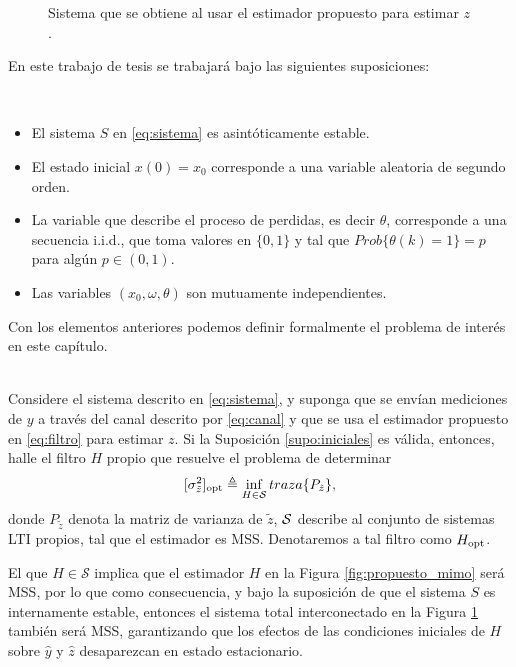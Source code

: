 \begin{figure}[htbp]
\centering
\scalebox{1.2}{}
\caption{Sistema que se obtiene al usar el estimador propuesto para estimar $z$.}
\label{fig:switcheado_mimo}
\end{figure}

En este trabajo de tesis se trabajar\'a bajo las siguientes suposiciones:
\begin{assu}\label{supo:iniciales}{\ \\}
\begin{itemize}
\item El sistema $S$ en \eqref{eq:sistema} es asint\'oticamente estable.
\item El estado inicial $x(0)=x_0$ corresponde a una variable aleatoria de segundo orden.
\item La variable que describe el proceso de perdidas, es decir $\theta$, corresponde a una secuencia i.i.d., que toma valores en $\{0,1\}$ y tal que $Prob\{\theta(k)=1\}=p$ para alg\'un $p\in \left( 0,1\right).$
\item Las variables $\left(x_0,\omega,\theta\right)$ son mutuamente independientes.
\end{itemize}
\end{assu}
Con los elementos anteriores podemos definir formalmente el problema de inter\'es en este cap\'itulo.
\begin{problema}\label{problema:def}{\ \\}
Considere el sistema descrito en \eqref{eq:sistema}, y suponga que se env\'ian mediciones de $y$ a trav\'es del canal descrito por \eqref{eq:canal} y que se usa el estimador propuesto en \eqref{eq:filtro} para estimar $z$. Si la Suposici\'on \ref{supo:iniciales} es v\'alida, entonces, halle el filtro $H$ propio que resuelve el problema de determinar
\begin{equation}\label{eq:infdef}
[\sigma_{\tilde{z}}^2]_{\opt}\treq \inf_{H\in \cal{S}}{traza\{ P_{\tilde{z}}\}},
\end{equation}
donde $P_{\tilde{z}}$ denota la matriz de varianza de $\tilde{z}$, $\cal{S}$ describe al conjunto de sistemas LTI propios, tal que el estimador es MSS. Denotaremos a tal filtro como $H_{\opt}$.
\QED
\end{problema}
\begin{obs}
El que $H \in \mathcal{S}$ implica que el estimador $H$ en la Figura \ref{fig:propuesto_mimo} ser\'a MSS, por lo que como consecuencia, y bajo la suposici\'on de que el sistema $S$ es internamente estable, entonces el sistema total interconectado en la Figura \ref{fig:switcheado_mimo} tambi\'en ser\'a MSS, garantizando que los efectos de las condiciones iniciales de $H$ sobre $\hat{y}$ y $\hat{z}$ desaparezcan en estado estacionario.
\end{obs}
